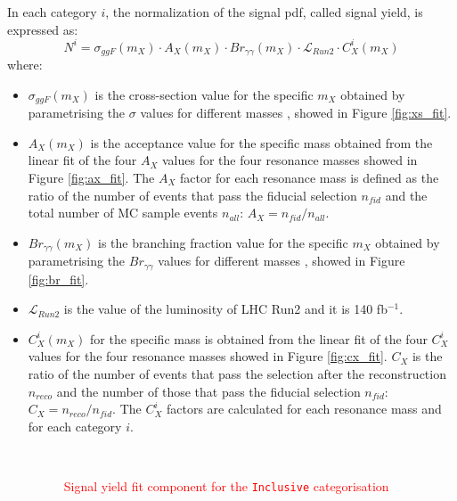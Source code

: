 \documentclass[a4paper, oneside, 11pt, openright]{book}
\begin{document}
 				
 				In each category $i$, the normalization of the signal pdf, called signal yield, is expressed as:
 				\begin{equation}\label{eq:signal_yield}
 					N^i = \sigma_{ggF}(m_X) \cdot A_X(m_X) \cdot Br_{\gamma\gamma}(m_X) \cdot \mathcal{L}_{Run2} \cdot C_X^i(m_X)
 				\end{equation}
 				where:
 				\begin{itemize}
 					\item $\sigma_{ggF}(m_X)$ is the cross-section value for the specific $m_X$ obtained by parametrising the $\sigma$ values for different masses \cite{yellow4}, showed in Figure \ref{fig:xs_fit}.
 					\item $A_X(m_X)$ is the acceptance value for the specific mass obtained from the linear fit of the four $A_X$ values for the four resonance masses showed in Figure \ref{fig:ax_fit}. The $A_X$ factor for each resonance mass is defined as the ratio of the number of events that pass the fiducial selection $n_{fid}$ and the total number of MC sample events $n_{all}$: $A_X = n_{fid}/n_{all}$.
 					\item $Br_{\gamma\gamma}(m_X)$ is the branching fraction value for the specific $m_X$ obtained by parametrising the $Br_{\gamma\gamma}$ values for different masses \cite{yellow3}, showed in Figure \ref{fig:br_fit}.  
 					\item $\mathcal{L}_{Run2}$ is the value of the luminosity of LHC Run2 and it is 140 fb$^{-1}$.
 					\item $C_X^i(m_X)$ for the specific mass is obtained from the linear fit of the four $C_X^i$ values for the four resonance masses showed in Figure \ref{fig:cx_fit}. $C_X$ is the ratio of the number of events that pass the selection after the reconstruction $n_{reco}$ and the number of those that pass the fiducial selection $n_{fid}$: $C_X = n_{reco}/n_{fid}$. The $C_X^i$ factors are calculated for each resonance mass and for each category $i$.
 				
 					\begin{figure}[h!]
 						\centering
 						\\
 						\caption{\textcolor{red}{Signal yield fit component for the \texttt{Inclusive} categorisation}}
 						\label{fig:signal_yiels}
 					\end{figure}
 				\end{itemize}
 				
\end{document}
